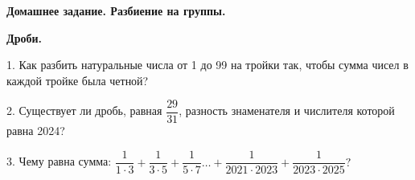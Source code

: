 \hspace{3mm}

\centerline{\bf \Huge Домашнее задание. Разбиение на группы.}

\centerline{\bf \Huge Дроби.}

\hspace{3mm}


1. Как разбить натуральные числа от 1 до 99 на тройки так, чтобы сумма чисел в каждой тройке была четной?

2. Существует ли дробь, равная $\dfrac{29}{31}$, разность знаменателя и числителя которой равна 2024?

3. Чему равна сумма:
$\dfrac{1}{1\cdot3}+ \dfrac{1}{3\cdot5} + \dfrac{1}{5\cdot7} … + \dfrac{1}{2021\cdot2023} + \dfrac{1}{2023\cdot2025} ?$